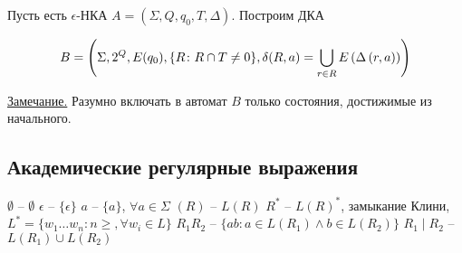 Пусть есть $ \epsilon $-НКА $ A = (\Sigma, Q, q_0, T, \Delta) $. Построим ДКА 

$$ B = \left({\Sigma, 2^{Q}, E(q_0), \{ R \colon R \cap T \neq 0 \}, \delta(R, a) = \bigcup \limits_{r \in R} E\left({\Delta\left({r, a}\right)}\right)}\right) $$

\underline{Замечание.} Разумно включать в автомат $ B $ только состояния, достижимые из начального.

\subsection{Академические регулярные выражения}

$ \emptyset $ -- $ \emptyset $
$ \epsilon $ -- $ \{ \epsilon \} $
$ a $ -- $ \{ a \} $, $ \forall a \in \Sigma $
$ (R) $ -- $ L(R) $
$ R^* $ -- $ L(R)^* $, замыкание Клини, $ L^* = \{ w_1 \ldots w_n \colon n \geqslant, \forall w_i \in L \} $
$ R_1 R_2 $ -- $ \{ ab \colon a \in L(R_1) \land b \in L(R_2) \} $
$ R_1 \mid R_2 $ -- $ L(R_1) \cup L(R_2) $
